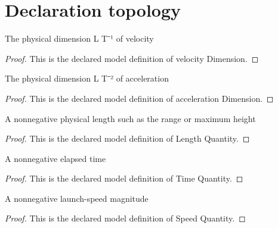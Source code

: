 \section{Declaration topology}
\begin{definition}
  \label{def:physics:phyx-mini-0796:phyxminiproblems-problemphyxmini0796-velocitydimension}
  The physical dimension L T⁻¹ of velocity
\end{definition}
\begin{proof}
  This is the declared model definition of velocity Dimension.
\end{proof}
\begin{definition}
  \label{def:physics:phyx-mini-0796:phyxminiproblems-problemphyxmini0796-accelerationdimension}
  The physical dimension L T⁻² of acceleration
\end{definition}
\begin{proof}
  This is the declared model definition of acceleration Dimension.
\end{proof}
\begin{definition}
  \label{def:physics:phyx-mini-0796:phyxminiproblems-problemphyxmini0796-lengthquantity}
  A nonnegative physical length such as the range or maximum height
\end{definition}
\begin{proof}
  This is the declared model definition of Length Quantity.
\end{proof}
\begin{definition}
  \label{def:physics:phyx-mini-0796:phyxminiproblems-problemphyxmini0796-timequantity}
  A nonnegative elapsed time
\end{definition}
\begin{proof}
  This is the declared model definition of Time Quantity.
\end{proof}
\begin{definition}
  \label{def:physics:phyx-mini-0796:phyxminiproblems-problemphyxmini0796-speedquantity}
  A nonnegative launch-speed magnitude
\end{definition}
\begin{proof}
  This is the declared model definition of Speed Quantity.
\end{proof}
